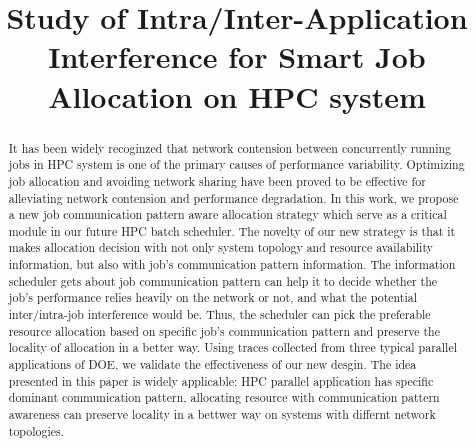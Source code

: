 \documentclass[conference]{IEEEtran}
\begin{document}
%
\title{Study of Intra/Inter-Application Interference for Smart Job Allocation on HPC system}
\author{



}

\maketitle

\begin{abstract} 

It has been widely recoginzed that network contension between concurrently running jobs in HPC system is one of the primary causes of performance variability. Optimizing job allocation and avoiding network sharing have been proved to be effective for alleviating network contension and performance degradation. In this work, we propose a new job communication pattern aware allocation strategy which serve as a critical module in our future HPC batch scheduler. The novelty of our new strategy is that it makes allocation decision with not only system topology and resource availability information, but also with job's communication pattern information. The information scheduler gets about job communication pattern can help it to decide whether the job’s performance relies heavily on the network or not, and what the potential inter/intra-job interference would be. Thus, the scheduler can pick the preferable resource allocation based on specific job's communication pattern and preserve the locality of allocation in a better way. Using traces collected from three typical parallel applications of DOE, we validate the effectiveness of our new desgin. The idea presented in this paper is widely applicable: HPC parallel application has specific dominant communication pattern, allocating resource with communication pattern awareness can preserve locality in a bettwer way on systems with differnt network topologies.

\end{abstract}
\end{document}
